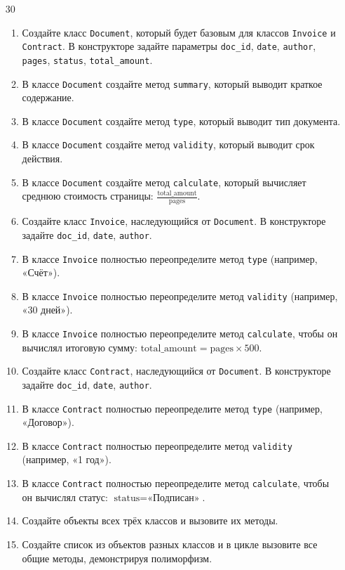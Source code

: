 \begin{enumerate}
\begin{enumerate}
\end{enumerate}
\item[30]
\begin{enumerate}
    \item Создайте класс \texttt{Document}, который будет базовым для классов \texttt{Invoice} и \texttt{Contract}. В конструкторе задайте параметры \texttt{doc\_id}, \texttt{date}, \texttt{author}, \texttt{pages}, \texttt{status}, \texttt{total\_amount}.
    \item В классе \texttt{Document} создайте метод \texttt{summary}, который выводит краткое содержание.
    \item В классе \texttt{Document} создайте метод \texttt{type}, который выводит тип документа.
    \item В классе \texttt{Document} создайте метод \texttt{validity}, который выводит срок действия.
    \item В классе \texttt{Document} создайте метод \texttt{calculate}, который вычисляет среднюю стоимость страницы: \( \frac{\text{total\_amount}}{\text{pages}} \).
    \item Создайте класс \texttt{Invoice}, наследующийся от \texttt{Document}. В конструкторе задайте \texttt{doc\_id}, \texttt{date}, \texttt{author}.
    \item В классе \texttt{Invoice} полностью переопределите метод \texttt{type} (например, «Счёт»).
    \item В классе \texttt{Invoice} полностью переопределите метод \texttt{validity} (например, «30 дней»).
    \item В классе \texttt{Invoice} полностью переопределите метод \texttt{calculate}, чтобы он вычислял итоговую сумму: \( \text{total\_amount} = \text{pages} \times 500 \).
    \item Создайте класс \texttt{Contract}, наследующийся от \texttt{Document}. В конструкторе задайте \texttt{doc\_id}, \texttt{date}, \texttt{author}.
    \item В классе \texttt{Contract} полностью переопределите метод \texttt{type} (например, «Договор»).
    \item В классе \texttt{Contract} полностью переопределите метод \texttt{validity} (например, «1 год»).
    \item В классе \texttt{Contract} полностью переопределите метод \texttt{calculate}, чтобы он вычислял статус: \( \text{status} = \text{«Подписан»} \).
    \item Создайте объекты всех трёх классов и вызовите их методы.
    \item Создайте список из объектов разных классов и в цикле вызовите все общие методы, демонстрируя полиморфизм.

\end{enumerate}
\end{enumerate}
